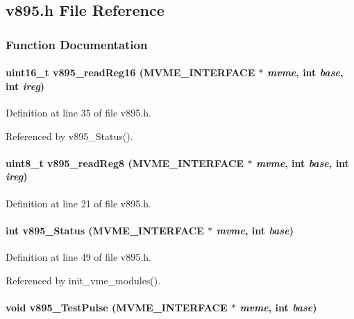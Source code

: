 \subsection{v895.h File Reference}
\label{v895_8h}


\subsubsection{Function Documentation}
\paragraph[{v895\_\-readReg16}]{\setlength{\rightskip}{0pt plus 5cm}uint16\_\-t v895\_\-readReg16 ({\bf MVME\_\-INTERFACE} $\ast$ {\em mvme}, \/  int {\em base}, \/  int {\em ireg})}\hfill\label{v895_8h_ae33ebea20fe8c5f0c50e4e4b69fa67ff}


Definition at line 35 of file v895.h.

Referenced by v895\_\-Status().
\paragraph[{v895\_\-readReg8}]{\setlength{\rightskip}{0pt plus 5cm}uint8\_\-t v895\_\-readReg8 ({\bf MVME\_\-INTERFACE} $\ast$ {\em mvme}, \/  int {\em base}, \/  int {\em ireg})}\hfill\label{v895_8h_ad8d28ec498178b3d4f08db936503dd25}


Definition at line 21 of file v895.h.
\paragraph[{v895\_\-Status}]{\setlength{\rightskip}{0pt plus 5cm}int v895\_\-Status ({\bf MVME\_\-INTERFACE} $\ast$ {\em mvme}, \/  int {\em base})}\hfill\label{v895_8h_a02ca1f73444908c760c94adc02ad5ff3}


Definition at line 49 of file v895.h.

Referenced by init\_\-vme\_\-modules().
\paragraph[{v895\_\-TestPulse}]{\setlength{\rightskip}{0pt plus 5cm}void v895\_\-TestPulse ({\bf MVME\_\-INTERFACE} $\ast$ {\em mvme}, \/  int {\em base})}\hfill\label{v895_8h_ac9efdf89a92e8929209bad8689b0b9b2}


